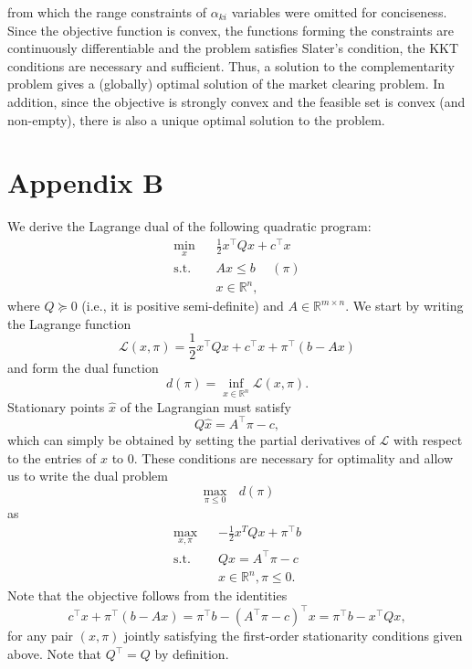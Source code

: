 \documentclass{article}
\begin{document}
from which the range constraints of $\alpha_{ki}$ variables were omitted for conciseness. Since the objective function is convex, the functions forming the constraints are continuously differentiable and the problem satisfies Slater's condition, the KKT conditions are necessary and sufficient. Thus, a solution to the complementarity problem gives a (globally) optimal solution of the market clearing problem. In addition, since the objective is strongly convex and the feasible set is convex (and non-empty), there is also a unique optimal solution to the problem.

\section*{Appendix B}
We derive the Lagrange dual of the following quadratic program:
\begin{align*}
\underset{x}{\min} \hspace{10pt} & \frac{1}{2}x^\top Q x + c^\top x\\
\mbox{s.t. } & Ax \le b \hspace{15pt} (\pi)\\
&x \in \mathbb{R}^n,
\end{align*}
where $Q \succeq 0$ (i.e., it is positive semi-definite) and $A \in \mathbb{R}^{m \times n}$. We start by writing the Lagrange function
\begin{equation*}
\mathcal{L}(x, \pi) = \frac{1}{2}x^\top Q x + c^\top x + \pi^\top(b - Ax)
\end{equation*}
and form the dual function
\begin{equation*}
d(\pi) = \underset{x \in \mathbb{R}^n}{\inf} \mathcal{L}(x, \pi).
\end{equation*}
Stationary points $\hat{x}$ of the Lagrangian must satisfy
\begin{equation*}
Q\hat{x} = A^\top \pi -c,
\end{equation*}
which can simply be obtained by setting the partial derivatives of $\mathcal{L}$ with respect to the entries of $x$ to $0$. These conditions are necessary for optimality and allow us to write the dual problem
\begin{equation*}
\underset{\pi \le 0}{\max} \mbox{ }d(\pi)
\end{equation*}
as
\begin{align*}
\underset{x, \pi}{\max} \hspace{10pt} & -\frac{1}{2}x^T Q x + \pi^\top b\\
\mbox{s.t. } & Qx = A^\top \pi -c\\
&x \in \mathbb{R}^n, \pi \le 0.
\end{align*}
Note that the objective follows from the identities
\begin{equation*}
c^\top x + \pi^\top(b - Ax) = \pi^\top b - (A^\top \pi - c)^\top x =  \pi^\top b - x^\top Q x,
\end{equation*}
for any pair $(x, \pi)$ jointly satisfying the first-order stationarity conditions given above. Note that $Q^\top = Q$ by definition. 
\end{document}
